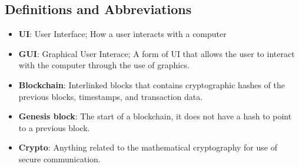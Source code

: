 \subsection{Definitions and Abbreviations}

\begin{itemize}
	\item \textbf{UI}: User Interface; How a user interacts with a computer
	\item \textbf{GUI}: Graphical User Interace; A form of UI that allows 
		  the user to interact with the computer through the use of graphics.
	\item \textbf{Blockchain}: Interlinked blocks that contains cryptographic hashes of the previous blocks,
							   timestamps, and transaction data.
	\item \textbf{Genesis block}: The start of a blockchain, it does not have a hash to point to a
								  previous block. 
 	\item \textbf{Crypto}: Anything related to the mathematical cryptography for use of secure communication.
\end{itemize}

